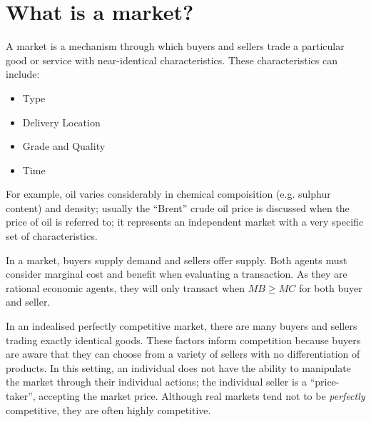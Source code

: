 \documentclass[12pt]{report}
\begin{document}
\section*{What is a market?}
A market is a mechanism through which buyers and sellers trade a particular good or service with 
near-identical characteristics. These characteristics can include:
\begin{itemize}
    \item Type
    \item Delivery Location
    \item Grade and Quality
    \item Time
\end{itemize}
For example, oil varies considerably in chemical compoisition (e.g. sulphur content) and density;
usually the ``Brent'' crude oil price is discussed when the price of oil is referred to; it represents
an independent market with a very specific set of characteristics.

\bigskip 
In a market, buyers supply demand and sellers offer supply. Both agents must consider marginal 
cost and benefit when evaluating a transaction. As they are rational economic agents, they
will only transact when \(MB \geq MC\) for both buyer and seller.

\bigskip
In an indealised perfectly competitive market, there are many buyers and sellers trading exactly
identical goods. These factors inform competition because buyers are aware that they can choose from
a variety of sellers with no differentiation of products. In this setting, an individual does not 
have the ability to manipulate the market through their individual actions; the individual seller
is a ``price-taker'', accepting the market price. Although real markets tend not to be \textit{perfectly} 
competitive, they are often highly competitive.
\end{document}
